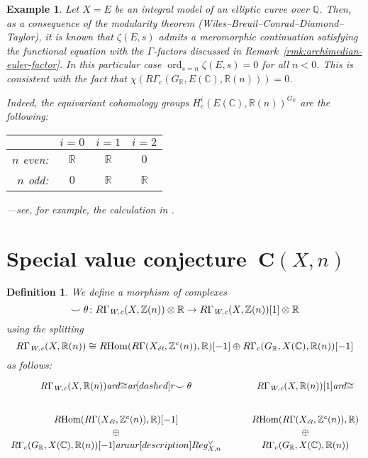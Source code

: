 \documentclass[10pt,a4paper,oneside,draft]{article}
\DeclareMathOperator{\Hom}{Hom}
\DeclareMathOperator{\ord}{ord}
\newcommand{\CC}{\mathbb{C}}
\newcommand{\QQ}{\mathbb{Q}}
\newcommand{\RR}{\mathbb{R}}
\newcommand{\ZZ}{\mathbb{Z}}
\newcommand{\ar}{\text{\it ar}}
\newcommand{\et}{\text{\it \'{e}t}}
\newcommand{\Wc}{\text{\it W,c}}
\newcommand{\RHom}{R\!\Hom}
\theoremstyle{myplain}
\theoremstyle{mydefinition}
\newtheorem{definition}[theorem]{Definition}
\newtheorem{example}[theorem]{Example}
\numberwithin{equation}{section}
\begin{document}
\begin{example}
  Let $X = E$ be an integral model of an elliptic curve over $\QQ$. Then, as a
  consequence of the modularity theorem
  (Wiles--Breuil--Conrad--Diamond--Taylor), it is known that $\zeta (E,s)$
  admits a meromorphic continuation satisfying the functional equation with the
  $\Gamma$-factors discussed in Remark~\ref{rmk:archimedian-euler-factor}.
  In this particular case $\ord_{s=n} \zeta (E,s) = 0$ for all $n < 0$. This is
  consistent with the fact that
  $\chi (R\Gamma_c (G_\RR, E (\CC), \RR (n))) = 0$.

  Indeed, the equivariant cohomology groups $H^i_c (E (\CC), \RR (n))^{G_\RR}$
  are the following:
  \begin{center}
    \renewcommand{\arraystretch}{1.5}
    \begin{tabular}{rccc}
      \hline
      & $i = 0$ & $i = 1$ & $i = 2$ \\
      \hline
      $n$ even: & $\RR$ & $\RR$ & $0$ \\
      $n$ odd: & $0$ & $\RR$ & $\RR$ \\
      \hline
    \end{tabular}
  \end{center}
  ---see, for example, the calculation in \cite[Lemma~A.6]{Siebel-2019}.
\end{example}


\section{Special value conjecture~$\mathbf{C} (X,n)$}
\label{sec:special-value-conjecture}

\begin{definition}
  We define a morphism of complexes
  \[ \smile\theta\colon R\Gamma_\Wc (X,\ZZ(n)) \otimes \RR \to
    R\Gamma_\Wc (X,\ZZ(n)) [1] \otimes \RR \]
  using the splitting \cite[Proposition~7.13]{Beshenov-Weil-etale-1}
  \[ R\Gamma_\Wc (X, \RR (n)) \cong
    \RHom (R\Gamma (X_\et, \ZZ^c (n)), \RR) [-1] \oplus
    R\Gamma_c (G_\RR, X (\CC), \RR (n)) [-1] \]
  as follows:
  \[ \begin{tikzcd}
      R\Gamma_\Wc (X, \RR(n)) \ar{d}{\cong}\ar[dashed]{r}{\smile\theta} & R\Gamma_\Wc (X, \RR(n)) [1]\ar{d}{\cong} \\
      \RHom (R\Gamma (X_\et, \ZZ^c (n)), \RR) [-1] & \RHom (R\Gamma (X_\et, \ZZ^c (n)), \RR) \\[-2em]
      \oplus & \oplus \\[-2em]
      R\Gamma_c (G_\RR, X (\CC), \RR (n)) [-1]\ar{uur}[description]{Reg_{X,n}^\vee} & R\Gamma_c (G_\RR, X (\CC), \RR (n))
    \end{tikzcd} \]
\end{definition}
\end{document}
